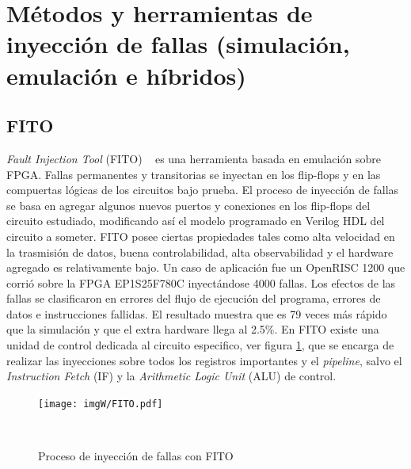 \documentclass[a4paper,openright,12pt]{report}
\begin{document}
\section{Métodos y herramientas de inyección de fallas (simulación, emulación e híbridos) }
 

\subsection{FITO}

\textit{Fault Injection Tool}  (FITO) ~\cite{4579806} es una herramienta basada en emulación sobre FPGA. Fallas permanentes y transitorias se inyectan en los flip-flops y en las compuertas lógicas de los circuitos bajo prueba. El proceso de inyección de fallas se basa en agregar algunos nuevos puertos  y conexiones en los flip-flops del circuito estudiado, modificando así el modelo  programado en Verilog HDL  del circuito  a someter. FITO posee ciertas propiedades tales como alta velocidad en la trasmisión de datos, buena controlabilidad, alta observabilidad y el hardware agregado es relativamente bajo. Un caso de aplicación fue  un OpenRISC 1200 que corrió sobre la FPGA EP1S25F780C inyectándose 4000 fallas. Los efectos de las fallas se clasificaron en errores del flujo de ejecución del programa, errores de datos e instrucciones fallidas. El resultado muestra que es 79 veces más rápido que la simulación y que el extra hardware llega al  2.5\%.
En FITO existe una unidad de control dedicada  al circuito especifico, ver figura \ref{FITO}, que se encarga de realizar las inyecciones  sobre todos los registros importantes y el \textit{pipeline}, salvo el \textit{Instruction Fetch} (IF)  y la \textit{Arithmetic Logic Unit}  (ALU)  de control.


\begin{figure}[H]
	\centering
	\texttt{[image: imgW/FITO.pdf]}
	\caption{Proceso de inyección de fallas con FITO}
    ~\cite{4579806}
	\label{FITO}
\end{figure}
\end{document}
